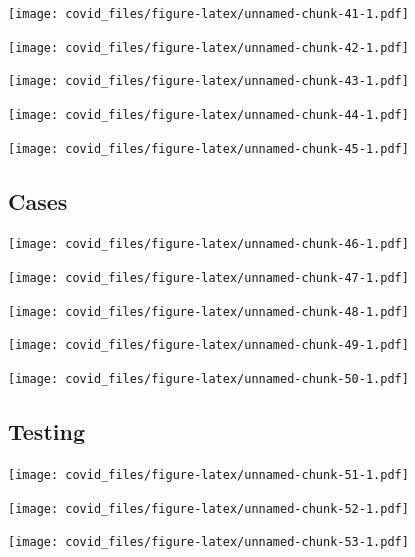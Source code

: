 \documentclass[]{article}
\begin{document}
\texttt{[image: covid\_files/figure-latex/unnamed-chunk-41-1.pdf]}

\texttt{[image: covid\_files/figure-latex/unnamed-chunk-42-1.pdf]}

\texttt{[image: covid\_files/figure-latex/unnamed-chunk-43-1.pdf]}

\texttt{[image: covid\_files/figure-latex/unnamed-chunk-44-1.pdf]}

\texttt{[image: covid\_files/figure-latex/unnamed-chunk-45-1.pdf]}

\newpage

\hypertarget{cases-2}{%
\subsection{Cases}\label{cases-2}}

\texttt{[image: covid\_files/figure-latex/unnamed-chunk-46-1.pdf]}

\texttt{[image: covid\_files/figure-latex/unnamed-chunk-47-1.pdf]}

\texttt{[image: covid\_files/figure-latex/unnamed-chunk-48-1.pdf]}

\texttt{[image: covid\_files/figure-latex/unnamed-chunk-49-1.pdf]}

\texttt{[image: covid\_files/figure-latex/unnamed-chunk-50-1.pdf]}

\newpage

\hypertarget{testing-2}{%
\subsection{Testing}\label{testing-2}}

\texttt{[image: covid\_files/figure-latex/unnamed-chunk-51-1.pdf]}

\texttt{[image: covid\_files/figure-latex/unnamed-chunk-52-1.pdf]}

\texttt{[image: covid\_files/figure-latex/unnamed-chunk-53-1.pdf]}
\end{document}
